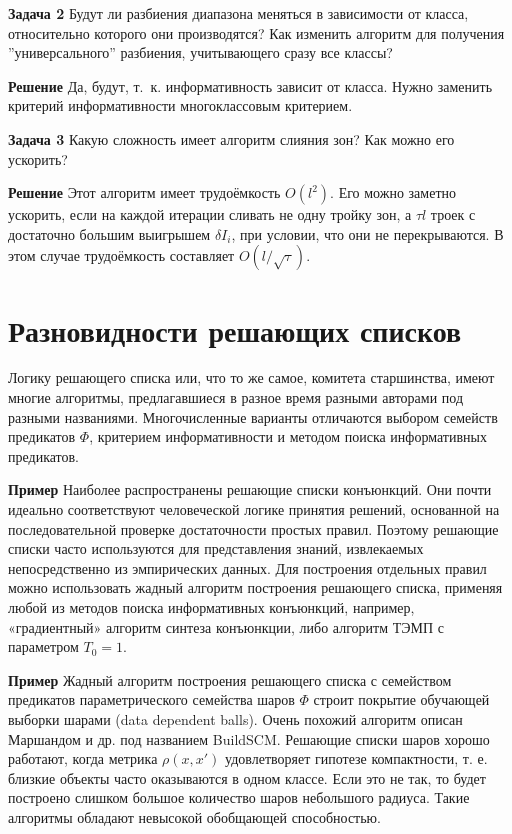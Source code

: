 \textbf{Задача 2}
Будут ли разбиения диапазона меняться в зависимости от класса, относительно которого они производятся? Как изменить алгоритм для получения ''универсального'' разбиения, учитывающего сразу все классы? 

\textbf{Решение}
Да, будут, т.~к. информативность зависит от класса. Нужно заменить критерий информативности многоклассовым критерием.

\textbf{Задача 3}
Какую сложность имеет алгоритм слияния зон? Как можно его ускорить?

\textbf{Решение}
Этот алгоритм имеет трудоёмкость $O(l^2)$. Его можно заметно ускорить, если на каждой итерации сливать не одну тройку зон, а $\tau l$ троек с достаточно большим выигрышем $\delta I_i$, при условии, что они не перекрываются. В этом случае трудоёмкость составляет $O(l / \sqrt{\tau})$.






\section{Разновидности решающих списков}

Логику решающего списка или, что то же самое, комитета старшинства, имеют многие алгоритмы, предлагавшиеся в разное время разными авторами под разными названиями. Многочисленные варианты отличаются выбором семейств предикатов $\Phi$, критерием информативности и методом поиска информативных предикатов.

\textbf{Пример} Наиболее распространены решающие списки конъюнкций. Они почти идеально соответствуют человеческой логике принятия решений, основанной на последовательной проверке достаточности простых правил. Поэтому решающие списки часто используются для представления знаний, извлекаемых непосредственно из эмпирических данных. Для построения отдельных правил можно использовать жадный алгоритм построения решающего списка, применяя любой из методов поиска информативных конъюнкций, например, «градиентный» алгоритм синтеза конъюнкции, либо алгоритм ТЭМП с параметром $T_0 = 1$.

\textbf{Пример} Жадный алгоритм построения решающего списка с семейством предикатов параметрического семейства шаров $\Phi$ строит покрытие обучающей выборки шарами (data dependent balls). Очень похожий алгоритм описан Маршандом и др. под названием BuildSCM. Решающие списки шаров хорошо работают, когда метрика $\rho(x, x')$ удовлетворяет гипотезе компактности, т. е. близкие объекты часто оказываются в одном классе. Если это не так, то будет построено слишком большое количество шаров небольшого радиуса. Такие алгоритмы обладают невысокой обобщающей способностью.

